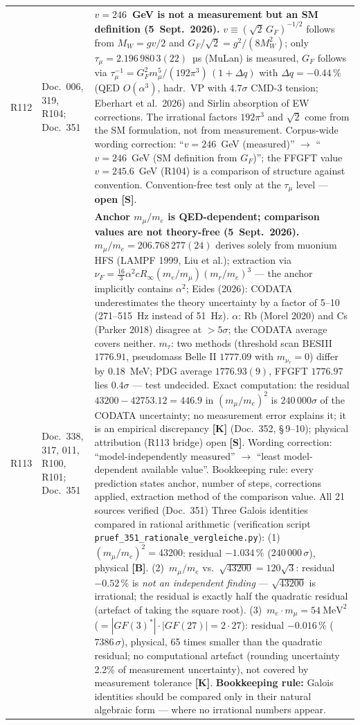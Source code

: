 \begin{longtable}{@{}p{0.9cm}p{3.1cm}p{10.2cm}@{}}
R112 & Doc.~006, 319, R104; Doc.~351 & \textbf{$v=246$~GeV is not a measurement but an SM definition \QM{} (5~Sept.~2026).} $v\equiv(\sqrt2\,G_F)^{-1/2}$ follows from $M_W=gv/2$ and $G_F/\sqrt2=g^2/(8M_W^2)$; only $\tau_\mu=2.196\,980\,3(22)$~µs (MuLan) is measured, $G_F$ follows via $\tau_\mu^{-1}=G_F^2m_\mu^5/(192\pi^3)\,(1+\Delta q)$ with $\Delta q=-0.44\,\%$ (QED $O(\alpha^3)$, hadr.\ VP with $4.7\sigma$ CMD-3 tension; Eberhart et al.\ 2026) and Sirlin absorption of EW corrections. The irrational factors $192\pi^3$ and $\sqrt2$ come from the SM formulation, not from measurement. Corpus-wide wording correction: ``$v=246$~GeV (measured)'' $\to$ ``$v=246$~GeV (SM definition from $G_F$)''; the FFGFT value $v=245.6$~GeV (R104) is a comparison of structure against convention. Convention-free test only at the $\tau_\mu$ level --- \textbf{open [S]}. \\
R113 & Doc.~338, 317, 011, R100, R101; Doc.~351 & \textbf{Anchor $m_\mu/m_e$ is QED-dependent; comparison values are not theory-free \QM{} (5~Sept.~2026).} $m_\mu/m_e=206.768\,277(24)$ derives solely from muonium HFS (LAMPF 1999, Liu et al.); extraction via $\nu_F=\tfrac{16}{3}\alpha^2cR_\infty(m_e/m_\mu)(m_r/m_e)^3$ --- the anchor implicitly contains $\alpha^2$; Eides (2026): CODATA underestimates the theory uncertainty by a factor of 5--10 (271--515~Hz instead of 51~Hz). $\alpha$: Rb (Morel 2020) and Cs (Parker 2018) disagree at $>5\sigma$; the CODATA average covers neither. $m_\tau$: two methods (threshold scan BESIII $1776.91$, pseudomass Belle II $1777.09$ with $m_{\nu_\tau}=0$) differ by 0.18~MeV; PDG average $1776.93(9)$, FFGFT $1776.97$ lies $0.4\sigma$ --- test undecided. Exact computation: the residual $43200-42753.12=446.9$ in $(m_\mu/m_e)^2$ is $240\,000\sigma$ of the CODATA uncertainty; no measurement error explains it; it is an empirical discrepancy \textbf{[K]} (Doc.~352, §\,9--10); physical attribution (R113 bridge) open \textbf{[S]}. Wording correction: ``model-independently measured'' $\to$ ``least model-dependent available value''. Bookkeeping rule: every prediction states anchor, number of steps, corrections applied, extraction method of the comparison value. All 21 sources verified (Doc.~351) Three Galois identities compared in rational arithmetic (verification script \texttt{pruef\_351\_rationale\_vergleiche.py}): (1)~$(m_\mu/m_e)^2=43200$: residual $-1.034\,\%$ ($240\,000\,\sigma$), physical \textbf{[B]}. (2)~$m_\mu/m_e$ vs.\ $\sqrt{43200}=120\sqrt{3}$: residual $-0.52\,\%$ is \emph{not an independent finding} --- $\sqrt{43200}$ is irrational; the residual is exactly half the quadratic residual (artefact of taking the square root). (3)~$m_e\cdot m_\mu=54~\text{MeV}^2$ ($=|GF(3)^*|\cdot|GF(27)|=2\cdot27$): residual $-0.016\,\%$ ($7386\,\sigma$), physical, 65 times smaller than the quadratic residual; no computational artefact (rounding uncertainty 2.2\% of measurement uncertainty), not covered by measurement tolerance \textbf{[K]}. \textbf{Bookkeeping rule:} Galois identities should be compared only in their natural algebraic form --- where no irrational numbers appear. \\

\end{longtable}
